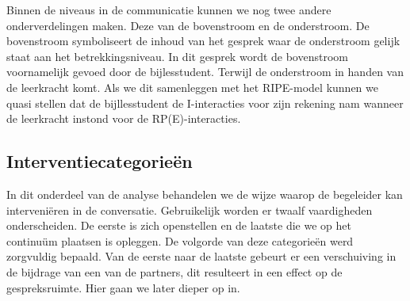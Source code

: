 \documentclass[a4paper,12pt]{article}
\theoremstyle{definition}
\begin{document}
Binnen de niveaus in de communicatie kunnen we nog twee andere onderverdelingen maken. Deze 
van de bovenstroom en de onderstroom. De bovenstroom symboliseert de inhoud van het gesprek 
waar de onderstroom gelijk staat aan het betrekkingsniveau. In dit gesprek wordt de bovenstroom 
voornamelijk gevoed door de bijlesstudent. Terwijl de onderstroom in handen van de leerkracht komt. Als 
we dit samenleggen met het RIPE-model kunnen we quasi stellen dat de bijllesstudent de I-interacties voor 
zijn rekening nam wanneer de leerkracht instond voor de RP(E)-interacties. 
\newpage
\subsection{Interventiecategorieën}
In dit onderdeel van de analyse behandelen we de wijze waarop de begeleider kan interveniëren 
in de conversatie. Gebruikelijk worden er twaalf vaardigheden onderscheiden. De eerste is zich 
openstellen en de laatste die we op het continuüm plaatsen is opleggen. De volgorde van deze categorieën 
werd zorgvuldig bepaald. Van de eerste naar de laatste gebeurt er een verschuiving in de bijdrage van 
een van de partners, dit resulteert in een effect op de gespreksruimte. Hier gaan we later dieper op 
in.\\
\end{document}
